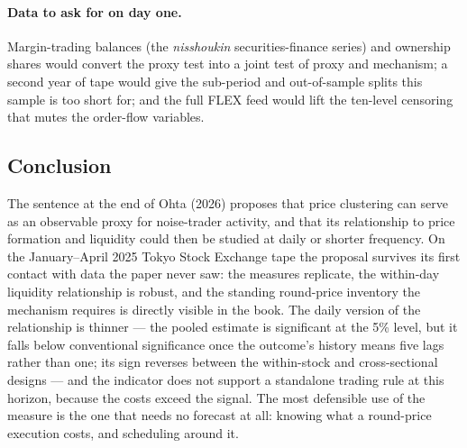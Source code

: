 \paragraph{Data to ask for on day one.} Margin-trading balances (the
\emph{nisshoukin} securities-finance series) and ownership shares would
convert the proxy test into a joint test of proxy and mechanism; a second year
of tape would give the sub-period and out-of-sample splits this sample is too
short for; and the full FLEX feed would lift the ten-level censoring that
mutes the order-flow variables.

\subsection{Conclusion}

The sentence at the end of Ohta (2026) proposes that price clustering can serve
as an observable proxy for noise-trader activity, and that its relationship to
price formation and liquidity could then be studied at daily or shorter
frequency. On the January--April 2025 Tokyo Stock Exchange tape the proposal survives its
first contact with data the paper never saw: the measures replicate, the
within-day liquidity relationship is robust, and the standing round-price
inventory the mechanism requires is directly visible in the book. The daily
version of the relationship is thinner --- the pooled estimate is significant at the 5\% level, but it falls below conventional significance once the outcome's history means five lags rather than one; its sign reverses between the within-stock and cross-sectional designs --- and the indicator
does not support a standalone trading rule at this horizon, because the costs
exceed the signal. The most defensible use of the measure is the one that needs
no forecast at all: knowing what a round-price execution costs, and scheduling
around it.
